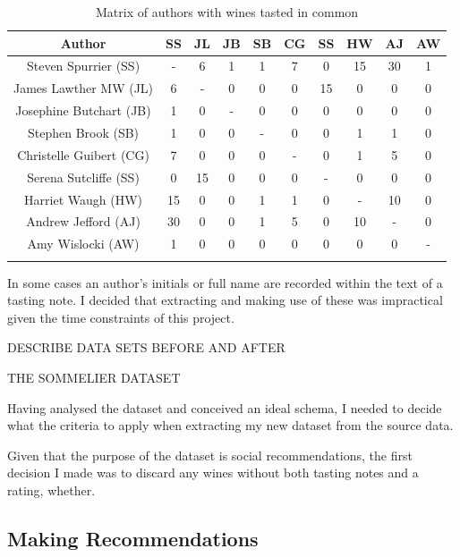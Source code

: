 \begin{table}[ht]
    \caption{Matrix of authors with wines tasted in common}
    \centering
    \begin{tabular}{c c c c c c c c c c}
        \\\hline\hline
        Author                   & SS & JL & JB & SB & CG & SS & HW & AJ & AW
        \\\hline
        Steven Spurrier (SS)     & -  & 6  & 1  & 1  & 7  & 0  & 15 & 30 & 1 \\
        James Lawther MW (JL)    & 6  & -  & 0  & 0  & 0  & 15 & 0  & 0  & 0 \\
        Josephine Butchart (JB)  & 1  & 0  & -  & 0  & 0  & 0  & 0  & 0  & 0 \\
        Stephen Brook (SB)       & 1  & 0  & 0  & -  & 0  & 0  & 1  & 1  & 0 \\
        Christelle Guibert (CG)  & 7  & 0  & 0  & 0  & -  & 0  & 1  & 5  & 0 \\
        Serena Sutcliffe (SS)    & 0  & 15 & 0  & 0  & 0  & -  & 0  & 0  & 0 \\
        Harriet Waugh (HW)       & 15 & 0  & 0  & 1  & 1  & 0  & -  & 10 & 0 \\
        Andrew Jefford (AJ)      & 30 & 0  & 0  & 1  & 5  & 0  & 10 & -  & 0 \\
        Amy Wislocki (AW)        & 1  & 0  & 0  & 0  & 0  & 0  & 0  & 0  & - \\
        \\\hline
    \end{tabular}
    \label{table:authormatrix}
\end{table}

In some cases an author's initials or full name are recorded within the text of a tasting note. I decided that extracting and making use of these was impractical given the time constraints of this project.

DESCRIBE DATA SETS BEFORE AND AFTER

THE SOMMELIER DATASET

Having analysed the dataset and conceived an ideal schema, I needed to decide what the criteria to apply when extracting my new dataset from the source data.

Given that the purpose of the dataset is social recommendations, the first decision I made was to discard any wines without both tasting notes and a rating, whether.

\subsection{Making Recommendations}

